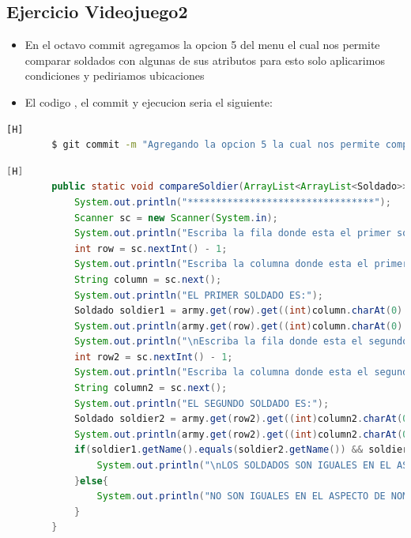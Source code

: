 \documentclass{article}
\begin{document}
	\subsection{Ejercicio Videojuego2}
	\begin{itemize}	
		\item En el octavo commit agregamos la opcion 5 del menu el cual nos permite comparar soldados con algunas de sus atributos para esto solo aplicarimos condiciones y pediriamos ubicaciones
		\item El codigo , el commit y ejecucion seria el siguiente:
	\end{itemize}	
	\begin{lstlisting}[language=bash,caption={Commit}][H]
		$ git commit -m "Agregando la opcion 5 la cual nos permite comparar soldados para esto aplicamos solo condiciones para poder verificar esto"
	\end{lstlisting}	
	\begin{lstlisting}[language=java,caption={Las lineas de codigos del metodo creado:}][H]
		public static void compareSoldier(ArrayList<ArrayList<Soldado>> army){
			System.out.println("*********************************");
			Scanner sc = new Scanner(System.in);
			System.out.println("Escriba la fila donde esta el primer soldado que va comparar:");
			int row = sc.nextInt() - 1;
			System.out.println("Escriba la columna donde esta el primer soldado que va comparar:");
			String column = sc.next();
			System.out.println("EL PRIMER SOLDADO ES:");
			Soldado soldier1 = army.get(row).get((int)column.charAt(0) - 65);
			System.out.println(army.get(row).get((int)column.charAt(0) - 65).toString());
			System.out.println("\nEscriba la fila donde esta el segundo soldado que va comparar:");
			int row2 = sc.nextInt() - 1;
			System.out.println("Escriba la columna donde esta el segundo soldado que va comparar:");
			String column2 = sc.next();
			System.out.println("EL SEGUNDO SOLDADO ES:");
			Soldado soldier2 = army.get(row2).get((int)column2.charAt(0) - 65);
			System.out.println(army.get(row2).get((int)column2.charAt(0) - 65).toString());
			if(soldier1.getName().equals(soldier2.getName()) && soldier1.getAttackLevel() == soldier2.getAttackLevel() && soldier1.getDefenseLevel() == soldier2.getDefenseLevel() && soldier1.getLifeActual() == soldier2.getLifeActual() && soldier1.getLives() == soldier2.getLives()){
				System.out.println("\nLOS SOLDADOS SON IGUALES EN EL ASPECTO DE NOMBRE , NIVEL DE ATAQUE , NIVEL DE DEFENSA , NIVEL DE VIDA ACTUAL Y ESTADO");
			}else{
				System.out.println("NO SON IGUALES EN EL ASPECTO DE NOMBRE , NIVEL DE ATAQUE , NIVEL DE DEFENSA , NIVEL DE VIDA ACTUAL Y ESTADO");
			}
		}
	\end{lstlisting}
\end{document}
